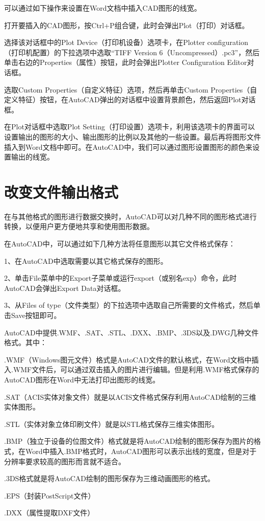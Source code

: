 可以通过如下操作来设置在Word文档中插入CAD图形的线宽。

打开要插入的CAD图形，按Ctrl+P组合键，此时会弹出Plot（打印）对话框。

选择该对话框中的Plot Device（打印机设备）选项卡，在Plotter configuration（打印机配置）的下拉选项中选取“TIFF Version 6（Uncompressed）.pc3”，然后单击右边的Properties（属性）按钮，此时会弹出Plotter Configuration Editor对话框。

选取Custom Properties（自定义特征）选项，然后再单击Custom Properties（自定义特征）按钮，在AutoCAD弹出的对话框中设置背景颜色，然后返回Plot对话框。

在Plot对话框中选取Plot Setting（打印设置）选项卡，利用该选项卡的界面可以设置输出的图形的大小、输出图形的比例以及其他的一些设置。最后再将图形文件插入到Word文档中即可。在AutoCAD中，我们可以通过图形设置图形的颜色来设置输出的线宽。



\section{改变文件输出格式}

在与其他格式的图形进行数据交换时，AutoCAD可以对几种不同的图形格式进行转换，以便用户更方便地共享和使用图形数据。

在AutoCAD中，可以通过如下几种方法将任意图形以其它文件格式保存：

1、在AutoCAD中选取需要以其它格式保存的图形。

2、单击File菜单中的Export子菜单或运行export（或别名exp）命令，此时AutoCAD会弹出Export Data对话框。

3、从Files of type（文件类型）的下拉选项中选取自己所需要的文件格式，然后单击Save按钮即可。

AutoCAD中提供.WMF、.SAT、.STL、.DXX、.BMP、.3DS以及.DWG几种文件格式。其中：

\begin{compactitem}
\item .WMF（Windows图元文件）格式是AutoCAD文件的默认格式，在Word文档中插入.WMF文件后，可以通过双击插入的图片进行编辑。但是利用.WMF格式保存的AutoCAD图形在Word中无法打印出图形的线宽。

\item .SAT（ACIS实体对象文件）就是以ACIS文件格式保存利用AutoCAD绘制的三维实体图形。

\item .STL（实体对象立体印刷文件）就是以STL格式保存三维实体图形。

\item .BMP（独立于设备的位图文件）格式就是将AutoCAD绘制的图形保存为图片的格式，在Word中插入.BMP格式时，AutoCAD图形可以表示出线的宽度，但是对于分辨率要求较高的图形而言就不适合。

\item .3DS格式就是将AutoCAD绘制的图形保存为三维动画图形的格式。

\item .EPS（封装PostScript文件）

\item .DXX（属性提取DXF文件）
\end{compactitem}

